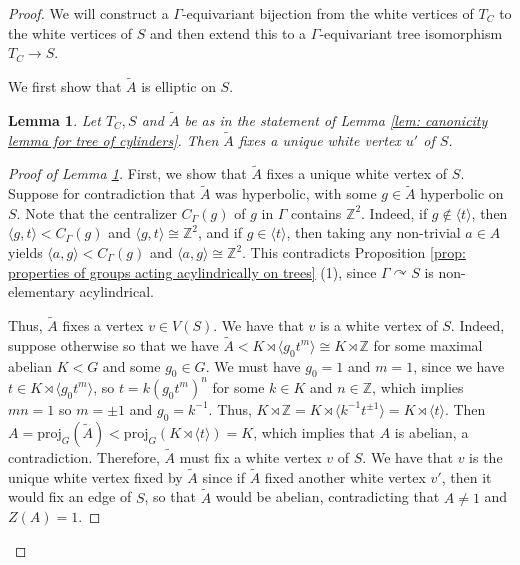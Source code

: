 \documentclass{amsart}
\newcommand{\Z}{\mathbb{Z}}
\theoremstyle{plain}
\newtheorem{lemma}[thm]{Lemma}
\theoremstyle{definition}
\theoremstyle{remark}
\begin{document}
\begin{proof}
    We will construct a $\Gamma$-equivariant bijection from the white vertices of $T_C$ to the white vertices of $S$ and then extend this to a $\Gamma$-equivariant tree isomorphism $T_C \to S$. 

    We first show that $\tilde{A}$ is elliptic on $S$. 
    
    \begin{lemma}
        \label{lem: tilde A fixes a unique white vertex}
        Let $T_C, S$ and $\tilde{A}$ be as in the statement of Lemma \ref{lem: canonicity lemma for tree of cylinders}. Then $\tilde{A}$ fixes a unique white vertex $u'$ of $S$. 
    \end{lemma}

    \begin{proof}[Proof of Lemma \ref{lem: tilde A fixes a unique white vertex}]
        First, we show that $\tilde{A}$ fixes a unique white vertex of $S$. Suppose for contradiction that $\tilde{A}$ was hyperbolic, with some $g \in \tilde{A}$ hyperbolic on $S$. Note that the centralizer $C_{\Gamma}(g)$ of $g$ in $\Gamma$ contains $\Z^2$. Indeed, if $g \notin \langle t \rangle$, then $\langle g, t \rangle < C_{\Gamma}(g)$ and $\langle g, t \rangle \cong \Z^2$, and if $g \in \langle t \rangle$, then taking any non-trivial $a \in A$ yields $\langle a, g \rangle < C_{\Gamma}(g)$ and $\langle a, g \rangle \cong \Z^2$. This contradicts Proposition \ref{prop: properties of groups acting acylindrically on trees} (1), since $\Gamma \curvearrowright S$ is non-elementary acylindrical. 

    Thus, $\tilde{A}$ fixes a vertex $v \in V(S)$. We have that $v$ is a white vertex of $S$. Indeed, suppose otherwise so that we have $\tilde{A} < K \rtimes \langle g_0t^m \rangle \cong K \rtimes \Z$ for some maximal abelian $K < G$ and some $g_0 \in G$. We must have $g_0 = 1$ and $m=1$, since we have $t \in K \rtimes \langle g_0t^m \rangle$, so $t = k (g_0t^m)^n$ for some $k \in K$ and $n \in \Z$, which implies $mn=1$ so $m = \pm 1$ and $g_0 = k^{-1}$. Thus, $K \rtimes \Z = K \rtimes \langle k^{-1}t^{\pm 1} \rangle = K \rtimes \langle t \rangle$. Then $A=\mathrm{proj}_G(\tilde{A}) < \mathrm{proj}_G(K \rtimes \langle t \rangle ) = K$, which implies that $A$ is abelian, a contradiction. Therefore, $\tilde{A}$ must fix a white vertex $v$ of $S$. We have that $v$ is the unique white vertex fixed by $\tilde{A}$ since if $\tilde{A}$ fixed another white vertex $v'$, then it would fix an edge of $S$, so that $\tilde{A}$ would be abelian, contradicting that $A \neq 1$ and $Z(A) = 1$. 
    \end{proof}
    

\end{proof}
\end{document}
